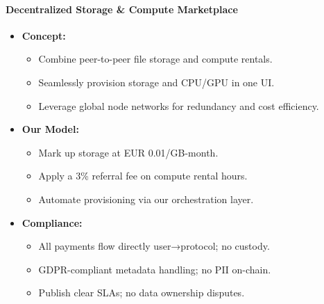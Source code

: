\documentclass[13pt]{extarticle}
\begin{document}
\paragraph{Decentralized Storage \& Compute Marketplace}
\begin{itemize}[left=1em]
  \item \textbf{Concept:}
    \begin{itemize}[left=1.2em]
      \item Combine peer-to-peer file storage and compute rentals.
      \item Seamlessly provision storage and CPU/GPU in one UI.
      \item Leverage global node networks for redundancy and cost efficiency.
    \end{itemize}
  \item \textbf{Our Model:}
    \begin{itemize}[left=1.2em]
      \item Mark up storage at EUR 0.01/GB-month.
      \item Apply a 3\% referral fee on compute rental hours.
      \item Automate provisioning via our orchestration layer.
    \end{itemize}
  \item \textbf{Compliance:}
    \begin{itemize}[left=1.2em]
      \item All payments flow directly user→protocol; no custody.
      \item GDPR-compliant metadata handling; no PII on-chain.
      \item Publish clear SLAs; no data ownership disputes.
    \end{itemize}
\end{itemize}
\end{document}
